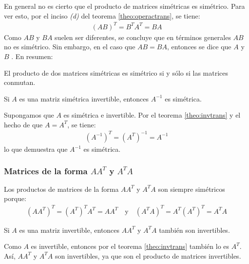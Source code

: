 \documentclass[a4paper,12pt]{article}
\begin{document}
\obse En general no es cierto que el producto de matrices simétricas es
simétrico. Para ver esto, por el inciso \emph{(d)} del teorema
\ref{theo:operactrans}, se tiene:
\begin{align*}
  (AB)^T=B^TA^T=BA
\end{align*}
Como $AB$ y $BA$ suelen ser diferentes, se concluye que en términos generales
$AB$ no es simétrico. Sin embargo, en el caso que $AB=BA$, entonces se dice
que $A$ y $B$ . En resumen:
\begin{concept}[i]
  El producto de dos matrices simétricas es simétrico si y sólo si las
  matrices conmutan.
\end{concept}

\begin{theorem}
  Si $A$ es una matriz simétrica invertible, entonces $A^{-1}$ es simétrica.
  \label{theo:matrsiminv}
\end{theorem}

\demo Supongamos que $A$ es simétrica e invertible. Por el teorema
\ref{theo:invtrans} y el hecho de que $A=A^T$, se tiene:
\begin{align*}
  \left( A^{-1} \right)^T=\left( A^T \right)^{-1}=A^{-1}
\end{align*}
lo que demuestra que $A^{-1}$ es simétrica.

\subsubsection{Matrices de la forma $AA^T$ y $A^TA$}

Los productos de matrices de la forma $AA^T$ y $A^TA$ son siempre simétricos
porque:
\begin{align*}
  \left( AA^T \right)^T = \left( A^T \right)^TA^T = AA^T \quad \mbox{y} \quad
  \left( A^TA \right)^T=A^T\left( A^T \right)^T=A^TA
\end{align*}

\begin{theorem}
  Si $A$ es una matriz invertible, entonces $AA^T$ y $A^TA$ también son
  invertibles.
  \label{theo:invATA}
\end{theorem}

\demo Como $A$ es invertible, entonces por el teorema \ref{theo:invtrans}
también lo es $A^T$. Así, $AA^T$ y $A^TA$ son invertibles, ya que son el
producto de matrices invertibles.


\newpage
\end{document}
